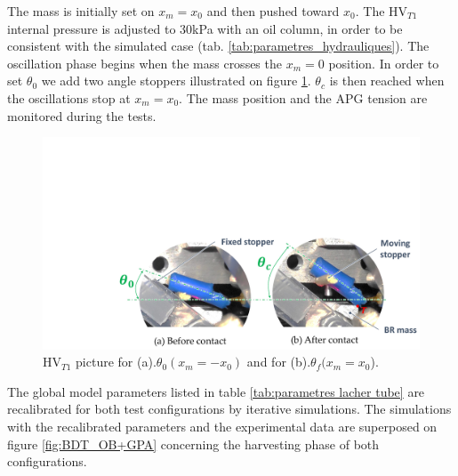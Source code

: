 \documentclass[3p,twocolumn,preprint]{elsarticle}
\begin{document}
The mass is initially set on $x_m=x_0$ and then pushed toward $x_0$. The HV$_{T1}$ internal pressure is adjusted to 30kPa with an oil column, in order to be consistent with the simulated case (tab. \ref{tab:parametres_hydrauliques}). The oscillation phase begins when the mass crosses the $x_m=0$ position. In order to set $\theta_0$ we add two angle stoppers illustrated on figure \ref{fig:contact_M_VH_lachers}. $\theta_c$ is then reached when the oscillations stop at $x_m=x_0$. The mass position and the APG tension are monitored during the tests.
\begin{figure}[!htbp]
	\begin{center}
		\captionsetup{justification=centering}
		\includegraphics[trim={6.9cm 0cm 0cm 9cm},clip,width=0.9\linewidth]{figures/contact_M_VH_lachers.pdf}
		\caption{HV$_{T1}$ picture for (a).$\theta_0(x_m=-x_{0})$ and for (b).$\theta_f(x_m=x_0$).}
		\label{fig:contact_M_VH_lachers}
	\end{center}
\end{figure}

The global model parameters listed in table \ref{tab:parametres lacher tube} are recalibrated for both test configurations by iterative simulations. The simulations with the recalibrated parameters and the experimental data are superposed on figure \ref{fig:BDT_OB+GPA} concerning the harvesting phase of both configurations. 
\end{document}
